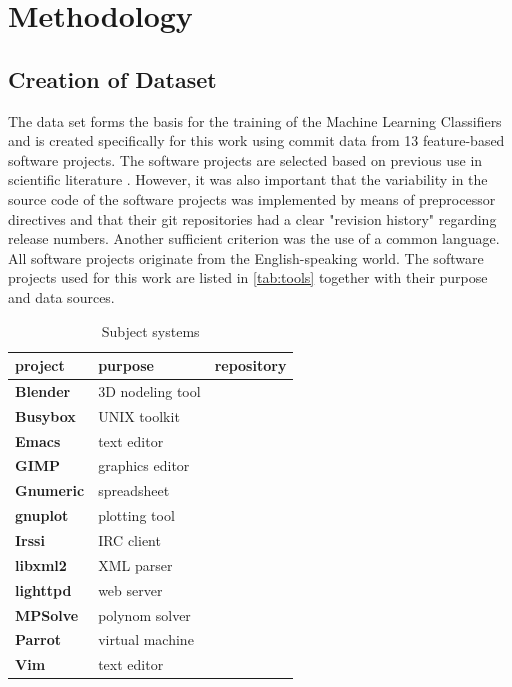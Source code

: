 
\section{Methodology}

\subsection{Creation of Dataset}

The data set forms the basis for the training of the Machine Learning Classifiers and is created specifically for this work using commit data from 13 feature-based software projects. The software projects are selected based on previous use in scientific literature \cite{Hunsen2015,Liebig2010,Queiroz2015,Queiroz2016}. However, it was also important that the variability in the source code of the software projects was implemented by means of preprocessor directives and that their git repositories had a clear "revision history" regarding release numbers. Another sufficient criterion was the use of a common language. All software projects originate from the English-speaking world. The software projects used for this work are listed in \autoref{tab:tools} together with their purpose and data sources.

\begin{table}[]
\centering
\caption{Subject systems}
\label{tab:systems}
\begin{tabular}{@{}lll@{}}
\toprule
project           & purpose          & repository \\ \midrule
\textbf{Blender}  & 3D nodeling tool & \cite{blender:online}          \\
\textbf{Busybox}  & UNIX toolkit     & \cite{busybox:online}          \\
\textbf{Emacs}    & text editor      & \cite{emacs:online}          \\
\textbf{GIMP}     & graphics editor  & \cite{gimp:online}          \\
\textbf{Gnumeric} & spreadsheet      & \cite{gnumeric:online}          \\
\textbf{gnuplot}  & plotting tool    & \cite{gnuplot:online}          \\
\textbf{Irssi}    & IRC client       & \cite{irssi:online}          \\
\textbf{libxml2}  & XML parser       & \cite{libxml2:online}          \\
\textbf{lighttpd} & web server       & \cite{lighttpd:online}          \\
\textbf{MPSolve}  & polynom solver   & \cite{mpsolve:online}         \\
\textbf{Parrot}   & virtual machine  & \cite{parrot:online}         \\
\textbf{Vim}      & text editor      & \cite{vim:online}         \\ \bottomrule
\end{tabular}
\end{table}

